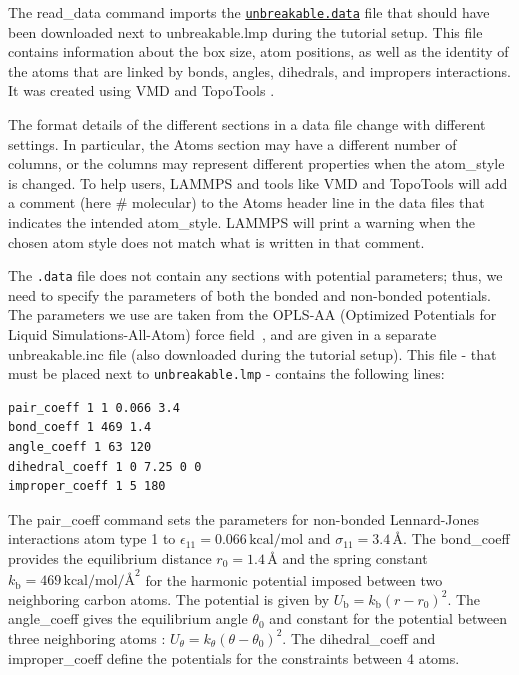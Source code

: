 \documentclass[9pt,tutorial]{livecoms}
\newcommand{\lmpcmd}[1]{\hspace{0pt}\colorbox{listing}{\textcolor{command}{\small{#1}}}\hspace{0pt}} %
\newcommand{\flecmd}[1]{\textcolor{command}{\texttt{#1}}} %
\newcommand{\dwlcmd}[1]{\textcolor{download}{\texttt{#1}}} %
\newcommand{\filepath}{https://raw.githubusercontent.com/lammpstutorials/lammpstutorials-article/main/files/}
\begin{document}
The \lmpcmd{read\_data} command imports the
\href{\filepath tutorial2/unbreakable.data}{\dwlcmd{unbreakable.data}}
file that should have been downloaded next
to \lmpcmd{unbreakable.lmp} during the tutorial setup. This file
contains information about the box size, atom positions, as well as the
identity of the atoms that are
linked by \lmpcmd{bonds}, \lmpcmd{angles}, \lmpcmd{dihedrals}, and
\lmpcmd{impropers} interactions. It was created using VMD and TopoTools
\cite{kohlmeyer2017topotools}.

\begin{note}
The format details of the
different sections in a data file change with different settings.  In
particular, the \lmpcmd{Atoms} section may have a different number of
columns, or the columns may represent different properties when the
\lmpcmd{atom\_style} is changed.  To help users, LAMMPS and tools like
VMD and TopoTools will add a comment (here \lmpcmd{\# molecular}) to the
\lmpcmd{Atoms} header line in the data files that indicates the intended
\lmpcmd{atom\_style}.  LAMMPS will print a warning when the chosen atom
style does not match what is written in that comment.
\end{note}

The \flecmd{.data} file does not contain any sections with potential parameters; thus,
we need to specify the parameters of both the bonded and
non-bonded potentials.  The parameters we use are taken
from the OPLS-AA (Optimized Potentials for Liquid Simulations-All-Atom)
force field~\cite{jorgensenDevelopmentTestingOPLS1996}, and are given
in a separate \lmpcmd{unbreakable.inc} file (also downloaded during
the tutorial setup).  This file - that must be placed
next to \flecmd{unbreakable.lmp} - contains the following lines:
\begin{lstlisting}
pair_coeff 1 1 0.066 3.4
bond_coeff 1 469 1.4
angle_coeff 1 63 120
dihedral_coeff 1 0 7.25 0 0
improper_coeff 1 5 180
\end{lstlisting}
The \lmpcmd{pair\_coeff} command sets the parameters for non-bonded
Lennard-Jones interactions atom type 1 to
$\epsilon_{11} = 0.066 \, \text{kcal/mol}$ and
$\sigma_{11} = 3.4 \, \text{\AA{}}$.  The \lmpcmd{bond\_coeff} provides
the equilibrium distance $r_0= 1.4 \, \text{\AA{}}$ and the
spring constant $k_\text{b} = 469 \, \text{kcal/mol/\AA{}}^2$ for the
harmonic potential imposed between two neighboring carbon atoms.  The potential
is given by $U_\text{b} = k_\text{b} ( r - r_0)^2$.  The
\lmpcmd{angle\_coeff} gives the equilibrium angle $\theta_0$ and
constant for the potential between three neighboring atoms :
$U_\theta = k_\theta ( \theta - \theta_0)^2$.  The
\lmpcmd{dihedral\_coeff} and \lmpcmd{improper\_coeff} define the potentials
for the constraints between 4 atoms.
\end{document}
